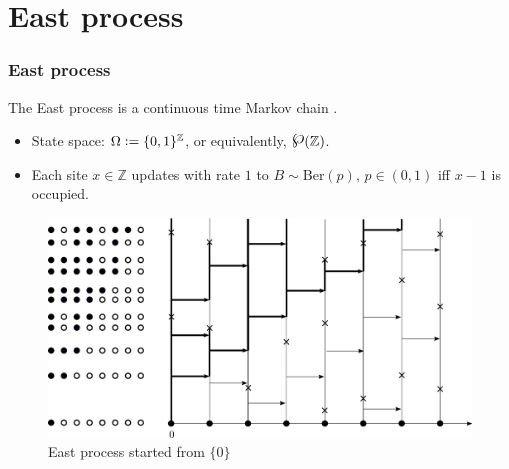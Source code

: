 \documentclass{beamer}
\newcommand{\defeq}{\vcentcolon=}
\newcommand{\powerset}{\raisebox{.15\baselineskip}{\Large\ensuremath{\wp}}}
\begin{document}
\section{East process}
\begin{frame}
\frametitle{East process}
\pause
\begin{block}{}
\vspace{-2mm}
The East process is a continuous time Markov chain
\pause. 
\begin{itemize}
\vspace{-1mm}
\item State space: $\Omega \defeq \{0, 1\}^\mathbb{Z}$, or equivalently, $\powerset(\mathbb{Z})$. 
\pause
\vspace{-1mm}
\item Each site $x \in \mathbb{Z}$ updates with rate $1$ to $B \sim \text{Ber}(p),\,p\in(0,1)$ \alert{iff} $x - 1$ is occupied. 
\end{itemize}
\end{block}
\vspace{-5mm}
\pause
\begin{figure}[!h]
\includegraphics[scale=0.9]{images/East_graphical_construction}
\caption{East process started from $\{0\}$}
\end{figure}
\end{frame}
\end{document}
